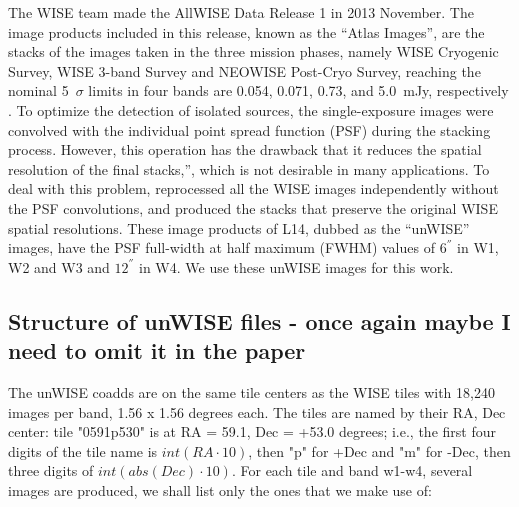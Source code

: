 \documentclass[numberedappendix,apj,twocolumn]{emulateapj}
\begin{document}

The WISE team made the AllWISE Data Release 1 in 2013 November. The image products included in this release, known as the ``Atlas Images'', are the stacks of the images taken in the three mission phases, namely WISE Cryogenic Survey, WISE 3-band Survey and NEOWISE Post-Cryo Survey, reaching the nominal 5~$\sigma$ limits in four bands are 0.054, 0.071, 0.73, and 5.0~mJy, respectively \citep[see][for details]{2013wise.rept....1C}. To optimize the detection of isolated sources, the single-exposure images were convolved with the individual point spread function (PSF) during the stacking process. However, this operation has the drawback that it reduces the spatial resolution of the final stacks,”, which is not desirable in many applications. To deal with this problem, \citet[][hereafter L14]{Lang2014e} reprocessed all the WISE images independently without the PSF convolutions, and produced the stacks that preserve the original WISE spatial resolutions. These image products of L14,  dubbed as the ``unWISE'' images, have the PSF full-width at half maximum (FWHM) values of $6^{''}$ in W1, W2 and W3 and $12^{''}$ in W4. We use these unWISE images for this work.


\subsection{Structure of unWISE files - once again maybe I need to omit it in the paper}

The unWISE coadds are on the same tile centers as the WISE tiles with 18,240 images per band, 1.56 x 1.56 degrees each. The tiles are named by their RA, Dec center: tile "0591p530" is at RA = 59.1, Dec = +53.0 degrees; i.e., the first four digits of the tile name is $int(RA \cdot 10)$, then "p" for +Dec and "m" for -Dec, then three digits of $int(abs(Dec)\cdot 10)$. For each tile and band w1-w4, several images are produced, we shall list only the ones that we make use of:
\end{document}
